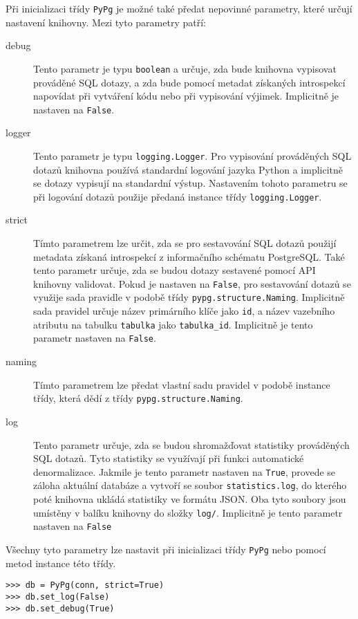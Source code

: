 \documentclass[11pt]{article}
\begin{document}
Při inicializaci třídy \lstinline[style=inline]|PyPg| je možné také předat nepovinné parametry, které určují nastavení knihovny. Mezi tyto parametry patří:
\begin{description}
\item[debug] Tento parametr je typu \lstinline[style=inline]|boolean| a určuje, zda bude knihovna vypisovat prováděné SQL dotazy, a zda bude pomocí metadat získaných introspekcí napovídat při vytváření kódu nebo při vypisování výjimek. Implicitně je nastaven na \lstinline[style=inline]|False|.
\item[logger] Tento parametr je typu \lstinline[style=inline]|logging.Logger|. Pro vypisování prováděných SQL dotazů knihovna používá standardní logování jazyka Python a implicitně se dotazy vypisují na standardní výstup. Nastavením tohoto parametru se při logování dotazů použije předaná instance třídy \lstinline[style=inline]|logging.Logger|.
\item[strict] Tímto parametrem lze určit, zda se pro sestavování SQL dotazů použijí metadata získaná introspekcí z informačního schématu PostgreSQL. Také tento parametr určuje, zda se budou dotazy sestavené pomocí API knihovny validovat. Pokud je nastaven na \lstinline[style=inline]|False|, pro sestavování dotazů se využije sada pravidle v podobě třídy \lstinline[style=inline]|pypg.structure.Naming|. Implicitně sada pravidel určuje název primárního klíče jako \lstinline[style=inline]|id|, a název vazebního atributu na tabulku \lstinline[style=inline]|tabulka| jako \lstinline[style=inline]|tabulka_id|. Implicitně je tento parametr nastaven na \lstinline[style=inline]|False|.
\item[naming] Tímto parametrem lze předat vlastní sadu pravidel v podobě instance třídy, která dědí z třídy \lstinline[style=inline]|pypg.structure.Naming|. 
\item[log] Tento parametr určuje, zda se budou shromažďovat statistiky prováděných SQL dotazů. Tyto statistiky se využívají při funkci automatické denormalizace. Jakmile je tento parametr nastaven na \lstinline[style=inline]|True|, provede se záloha aktuální databáze a vytvoří se soubor \lstinline[style=inline]|statistics.log|, do kterého poté knihovna ukládá statistiky ve formátu JSON. Oba tyto soubory jsou umístěny v balíku knihovny do složky \lstinline[style=inline]|log/|. Implicitně je tento parametr nastaven na \lstinline[style=inline]|False|
\end{description}
Všechny tyto parametry lze nastavit při inicializaci třídy \lstinline[style=inline]|PyPg| nebo pomocí metod instance této třídy.
\begin{lstlisting}[style=python]
>>> db = PyPg(conn, strict=True)
>>> db.set_log(False)
>>> db.set_debug(True)
\end{lstlisting}
\end{document}
